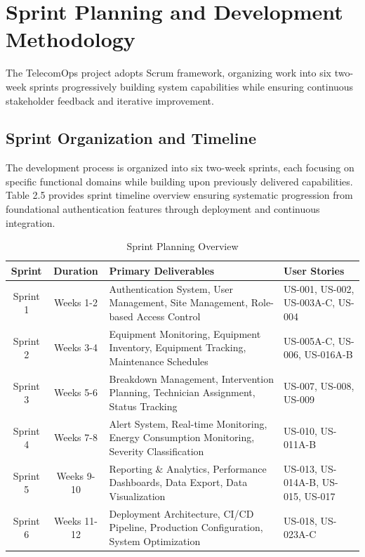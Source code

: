 \section{Sprint Planning and Development Methodology}

The TelecomOps project adopts Scrum framework, organizing work into six two-week sprints progressively building system capabilities while ensuring continuous stakeholder feedback and iterative improvement.

\subsection{Sprint Organization and Timeline}

The development process is organized into six two-week sprints, each focusing on specific functional domains while building upon previously delivered capabilities. Table 2.5 provides sprint timeline overview ensuring systematic progression from foundational authentication features through deployment and continuous integration.

\begin{table}[H]
\centering
\small
\begin{tabular}{|c|c|p{4.8cm}|p{3.7cm}|}
\hline
\textbf{Sprint} & \textbf{Duration} & \textbf{Primary Deliverables} & \textbf{User Stories} \\
\hline

Sprint 1 & Weeks 1-2 & Authentication System, User Management, Site Management, Role-based Access Control & US-001, US-002, US-003A-C, US-004 \\
\hline

Sprint 2 & Weeks 3-4 & Equipment Monitoring, Equipment Inventory, Equipment Tracking, Maintenance Schedules & US-005A-C, US-006, US-016A-B \\
\hline

Sprint 3 & Weeks 5-6 & Breakdown Management, Intervention Planning, Technician Assignment, Status Tracking & US-007, US-008, US-009 \\
\hline

Sprint 4 & Weeks 7-8 & Alert System, Real-time Monitoring, Energy Consumption Monitoring, Severity Classification & US-010, US-011A-B \\
\hline

Sprint 5 & Weeks 9-10 & Reporting \& Analytics, Performance Dashboards, Data Export, Data Visualization & US-013, US-014A-B, US-015, US-017 \\
\hline

Sprint 6 & Weeks 11-12 & Deployment Architecture, CI/CD Pipeline, Production Configuration, System Optimization & US-018, US-023A-C \\
\hline

\end{tabular}
\caption{Sprint Planning Overview}
\label{tab:sprint_planning}
\end{table}

